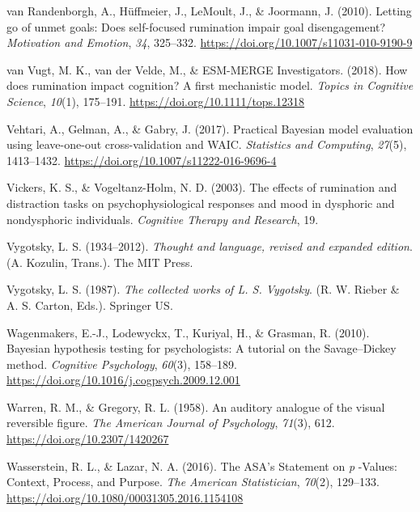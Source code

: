 \documentclass[a4paper,12pt,twoside,onecolumn,openright,final,oldfontcommands]{memoir}
\begin{document}
\leavevmode\hypertarget{ref-VanRandenborgh2010}{}%
van Randenborgh, A., Hüffmeier, J., LeMoult, J., \& Joormann, J. (2010). Letting go of unmet goals: Does self-focused rumination impair goal disengagement? \emph{Motivation and Emotion}, \emph{34}, 325--332. \url{https://doi.org/10.1007/s11031-010-9190-9}

\leavevmode\hypertarget{ref-van_vugt_how_2018}{}%
van Vugt, M. K., van der Velde, M., \& ESM-MERGE Investigators. (2018). How does rumination impact cognition? A first mechanistic model. \emph{Topics in Cognitive Science}, \emph{10}(1), 175--191. \url{https://doi.org/10.1111/tops.12318}

\leavevmode\hypertarget{ref-vehtari_practical_2017}{}%
Vehtari, A., Gelman, A., \& Gabry, J. (2017). Practical Bayesian model evaluation using leave-one-out cross-validation and WAIC. \emph{Statistics and Computing}, \emph{27}(5), 1413--1432. \url{https://doi.org/10.1007/s11222-016-9696-4}

\leavevmode\hypertarget{ref-vickers_effects_2003}{}%
Vickers, K. S., \& Vogeltanz-Holm, N. D. (2003). The effects of rumination and distraction tasks on psychophysiological responses and mood in dysphoric and nondysphoric individuals. \emph{Cognitive Therapy and Research}, 19.

\leavevmode\hypertarget{ref-vygotsky_thought_1934}{}%
Vygotsky, L. S. (1934--2012). \emph{Thought and language, revised and expanded edition}. (A. Kozulin, Trans.). The MIT Press.

\leavevmode\hypertarget{ref-vygotsky_collected_1987}{}%
Vygotsky, L. S. (1987). \emph{The collected works of L. S. Vygotsky}. (R. W. Rieber \& A. S. Carton, Eds.). Springer US.

\leavevmode\hypertarget{ref-wagenmakers_bayesian_2010}{}%
Wagenmakers, E.-J., Lodewyckx, T., Kuriyal, H., \& Grasman, R. (2010). Bayesian hypothesis testing for psychologists: A tutorial on the Savage--Dickey method. \emph{Cognitive Psychology}, \emph{60}(3), 158--189. \url{https://doi.org/10.1016/j.cogpsych.2009.12.001}

\leavevmode\hypertarget{ref-warren_auditory_1958}{}%
Warren, R. M., \& Gregory, R. L. (1958). An auditory analogue of the visual reversible figure. \emph{The American Journal of Psychology}, \emph{71}(3), 612. \url{https://doi.org/10.2307/1420267}

\leavevmode\hypertarget{ref-wasserstein_asas_2016}{}%
Wasserstein, R. L., \& Lazar, N. A. (2016). The ASA's Statement on \emph{p} -Values: Context, Process, and Purpose. \emph{The American Statistician}, \emph{70}(2), 129--133. \url{https://doi.org/10.1080/00031305.2016.1154108}
\end{document}
